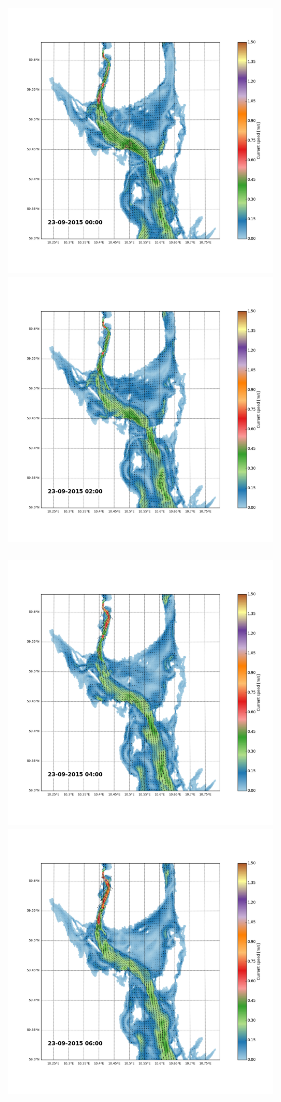 \documentclass[12pt,a4paper,english]{article}
\begin{document}
\begin{figure}[h]
\centerline{
\includegraphics*[trim=2.0cm 3cm 6.0cm 3.5cm,clip=true,height=7cm]{Python/stromfelt_46}
\includegraphics*[trim=3.7cm 3cm 1.3cm 3.5cm,clip=true,height=7cm]{Python/stromfelt_48}
}
\centerline{
\includegraphics*[trim=2.0cm 3cm 6.0cm 3.5cm,clip=true,height=7cm]{Python/stromfelt_50}
\includegraphics*[trim=3.7cm 3cm 1.3cm 3.5cm,clip=true,height=7cm]{Python/stromfelt_52}
}
\end{figure}
\end{document}
